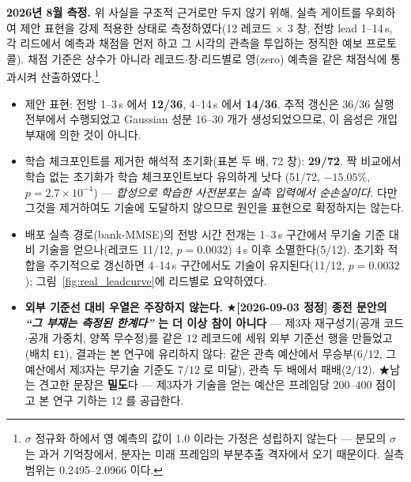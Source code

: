 \documentclass[11pt]{report}
\numberwithin{equation}{chapter}
\numberwithin{figure}{chapter}
\numberwithin{table}{chapter}
\begin{document}
\textbf{2026년 8월 측정.} 위 사실을 구조적 근거로만 두지 않기 위해, 실측 게이트를 우회하여
제안 표현을 강제 적용한 상태로 측정하였다(12 레코드 $\times$ 3 창, 전방 lead 1--14\,s,
각 리드에서 예측과 채점을 먼저 하고 그 시각의 관측을 투입하는 정직한 예보 프로토콜).
채점 기준은 상수가 아니라 레코드$\cdot$창$\cdot$리드별로 영(zero) 예측을 같은 채점식에
통과시켜 산출하였다.\footnote{$\sigma$ 정규화 하에서 영 예측의 값이 1.0 이라는 가정은
성립하지 않는다 --- 분모의 $\sigma$ 는 과거 기억창에서, 분자는 미래 프레임의 부분추출
격자에서 오기 때문이다. 실측 범위는 0.2495--2.0966 이다.}
\begin{itemize}
  \item 제안 표현: 전방 1--3\,s 에서 \textbf{12/36}, 4--14\,s 에서 \textbf{14/36}.
        추적 갱신은 36/36 실행 전부에서 수행되었고 Gaussian 성분 16--30 개가 생성되었으므로,
        이 음성은 개입 부재에 의한 것이 아니다.
  \item 학습 체크포인트를 제거한 해석적 초기화(표본 두 배, 72 창): \textbf{29/72}.
        짝 비교에서 학습 없는 초기화가 학습 체크포인트보다 유의하게 낫다
        (51/72, $-15.05\%$, $p=2.7\times10^{-4}$) --- \emph{합성으로 학습한 사전분포는
        실측 입력에서 순손실이다}. 다만 그것을 제거하여도 기술에 도달하지 않으므로
        원인을 표현으로 확정하지는 않는다.
  \item 배포 실측 경로(bank-MMSE)의 전방 시간 전개는 1--3\,s 구간에서 무기술 기준 대비
        기술을 얻으나(레코드 11/12, $p=0.0032$) 4\,s 이후 소멸한다(5/12). 초기화 적합을
        주기적으로 갱신하면 4--14\,s 구간에서도 기술이 유지된다(11/12, $p=0.0032$);
        그림~\ref{fig:real_leadcurve}에 리드별로 요약하였다.
  \item \textbf{외부 기준선 대비 우열은 주장하지 않는다.}
        ★\textbf{[2026-09-03 정정] 종전 문안의 \emph{``그 부재는 측정된 한계다''} 는 더 이상
        참이 아니다} --- 제3자 재구성기(공개 코드$\cdot$공개 가중치, 양쪽 무수정)를 같은 $12$
        레코드에 세워 외부 기준선 행을 만들었고(배치 \texttt{E1}), 결과는 본 연구에 유리하지
        않다: 같은 관측 예산에서 무승부($6/12$, 그 예산에서 제3자는 무기술 기준도 $7/12$ 로
        미달), 관측 두 배에서 패배($2/12$). ★남는 견고한 문장은 \textbf{밀도}다 --- 제3자가
        기술을 얻는 예산은 프레임당 $200$--$400$ 점이고 본 연구 기하는 $12$ 를 공급한다.

\end{itemize}
\end{document}

